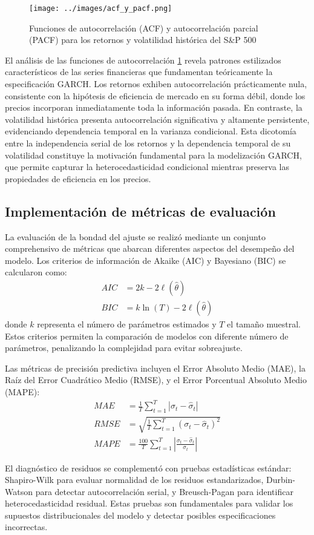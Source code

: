 \begin{figure}[hbt!]
    \centering
    \texttt{[image: ../images/acf\_y\_pacf.png]}
    \caption{Funciones de autocorrelación (ACF) y autocorrelación parcial (PACF) para los retornos y volatilidad histórica del S\&P 500}
    \label{fig:acf_pacf}   
\end{figure}
\newpage
El análisis de las funciones de autocorrelación \ref{fig:acf_pacf} revela patrones estilizados característicos de las series financieras que fundamentan teóricamente la especificación GARCH. Los retornos exhiben autocorrelación prácticamente nula, consistente con la hipótesis de eficiencia de mercado en su forma débil, donde los precios incorporan inmediatamente toda la información pasada. En contraste, la volatilidad histórica presenta autocorrelación significativa y altamente persistente, evidenciando dependencia temporal en la varianza condicional. Esta dicotomía entre la independencia serial de los retornos y la dependencia temporal de su volatilidad constituye la motivación fundamental para la modelización GARCH, que permite capturar la heterocedasticidad condicional mientras preserva las propiedades de eficiencia en los precios.

\subsection{Implementación de métricas de evaluación}

La evaluación de la bondad del ajuste se realizó mediante un conjunto comprehensivo de métricas que abarcan diferentes aspectos del desempeño del modelo. Los criterios de información de Akaike (AIC) y Bayesiano (BIC) se calcularon como:
\begin{align}
    AIC &= 2k - 2\ell(\hat{\theta})\\
    BIC &= k\ln(T) - 2\ell(\hat{\theta})
\end{align}
donde $k$ representa el número de parámetros estimados y $T$ el tamaño muestral. Estos criterios permiten la comparación de modelos con diferente número de parámetros, penalizando la complejidad para evitar sobreajuste.

Las métricas de precisión predictiva incluyen el Error Absoluto Medio (MAE), la Raíz del Error Cuadrático Medio (RMSE), y el Error Porcentual Absoluto Medio (MAPE):
\begin{align}
    MAE &= \frac{1}{T}\sum_{t=1}^{T}|\sigma_{t} - \hat{\sigma}_t|\\
    RMSE &= \sqrt{\frac{1}{T}\sum_{t=1}^{T}(\sigma_{t} - \hat{\sigma}_t)^2}\\
    MAPE &= \frac{100}{T}\sum_{t=1}^{T}\left|\frac{\sigma_{t} - \hat{\sigma}_t}{\sigma_{t}}\right|
\end{align}

El diagnóstico de residuos se complementó con pruebas estadísticas estándar: Shapiro-Wilk para evaluar normalidad de los residuos estandarizados, Durbin-Watson para detectar autocorrelación serial, y Breusch-Pagan para identificar heterocedasticidad residual. Estas pruebas son fundamentales para validar los supuestos distribucionales del modelo y detectar posibles especificaciones incorrectas.